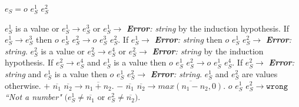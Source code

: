 \begin{case}

$e_{S}=o$ $e_{S}^{1}$ $e_{S}^{2}$

$e_{S}^{1}$ is a value or $e_{S}^{1}\rightarrow e_{S}^{3}$ or $e_{S}^{1}\rightarrow$ \emph{\textbf{Error}: string} by the induction hypothesis.  If $e_{S}^{1}\rightarrow e_{S}^{3}$ then $o$ $e_{S}^{1}$ $e_{S}^{2}\rightarrow o$ $e_{S}^{3}$ $e_{S}^{2}$.  If $e_{S}^{1}\rightarrow$ \emph{\textbf{Error}: string} then $o$ $e_{S}^{1}$ $e_{S}^{2}\rightarrow$ \emph{\textbf{Error}: string}.  $e_{S}^{2}$ is a value or $e_{S}^{2}\rightarrow e_{S}^{4}$ or $e_{S}^{2}\rightarrow$ \emph{\textbf{Error}: string} by the induction hypothesis.  If $e_{S}^{2}\rightarrow e_{S}^{4}$ and $e_{S}^{1}$ is a value then $o$ $e_{S}^{1}$ $e_{S}^{2}\rightarrow o$ $e_{S}^{1}$ $e_{S}^{4}$.  If $e_{S}^{2}\rightarrow$ \emph{\textbf{Error}: string} and $e_{S}^{1}$ is a value then $o$ $e_{S}^{1}$ $e_{S}^{2}\rightarrow$ \emph{\textbf{Error}: string}.  $e_{S}^{1}$ and $e_{S}^{2}$ are values otherwise.  $+$ $\overline{n_{1}}$ $\overline{n_{2}}\rightarrow\overline{n_{1}+n_{2}}$.  $-$ $\overline{n_{1}}$ $\overline{n_{2}}\rightarrow\overline{max(n_{1}-n_{2},0)}$.  $o$ $e_{S}^{1}$ $e_{S}^{2}\rightarrow\mathtt{wrong}$ \emph{``Not a number"} $(e_{S}^{1}\neq\overline{n_{1}}$ or $e_{S}^{2}\neq\overline{n_{2}})$.

\end{case}
